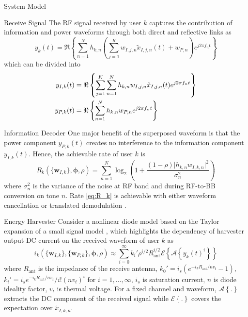 \documentclass{IEEEtran}
\begin{document}
\begin{section}{System Model}
	\begin{subsection}{Receive Signal}
		The RF signal received by user $k$ captures the contribution of information and power waveforms through both direct and reflective links as
		\begin{equation}\label{eq:y_k}
			y_k(t)=\Re\left\{\sum_{n=1}^N{h_{{k,n}}}\left(\sum_{j=1}^K{w_{I,j,n}\tilde{x}_{I,j,n}(t)}+w_{P,n}\right){e^{j2{\pi}{f_n}{t}}}\right\}
		\end{equation}
		which can be divided into
		\begin{align}\label{eq:y_{I/P,k}}
			y_{I,k}(t) & = \Re\left\{\sum_{j=1}^K\sum_{n=1}^N{h_{{k,n}}}{w_{I,j,n}\tilde{x}_{I,j,n}(t)}{e^{j2{\pi}{f_n}{t}}}\right\}\\
			y_{P,k}(t) & = \Re\left\{\sum_{n=1}^N{h_{{k,n}}}w_{P,n}{e^{j2{\pi}{f_n}{t}}}\right\}
		\end{align}
	\end{subsection}

	\begin{subsection}{Information Decoder}
		One major benefit of the superposed waveform is that the power component $y_{P,k}(t)$ creates no interference to the information component $y_{I,k}(t)$. Hence, the achievable rate of user $k$ is
		\begin{equation}\label{eq:R_k}
			R_k(\{\boldsymbol{w}_{I,k}\},\boldsymbol{\phi},\rho)=\sum_{n=1}^N{\log_2\left(1+\frac{(1-\rho)\lvert h_{k,n}w_{I,k,n} \rvert^2}{\sigma_n^2}\right)}
		\end{equation}
		where $\sigma_n^2$ is the variance of the noise at RF band and during RF-to-BB conversion on tone $n$. Rate \ref{eq:R_k} is achievable with either waveform cancellation or translated demodulation \cite{Clerckx2018b}.
	\end{subsection}

	\begin{subsection}{Energy Harvester}
		Consider a nonlinear diode model based on the Taylor expansion of a small signal model \cite{Clerckx2016a,Clerckx2018b}, which highlights the dependency of harvester output DC current on the received waveform of user $k$ as
		\begin{equation}\label{eq:i_k}
			i_k(\{\boldsymbol{w}_{I,k}\},\{\boldsymbol{w}_{P,k}\},\boldsymbol{\phi},\rho)\approx\sum_{i=0}^{\infty}{k_i'}{\rho^{i/2}}{R_{\text{ant}}^{i/2}}\mathcal{E}\left\{{\mathcal{A}\left\{y_k(t)^i\right\}}\right\}
		\end{equation}
		where $R_{\text{ant}}$ is the impedance of the receive antenna, $k_0'=i_s(e^{-i_kR_{\text{ant}}/nv_t}-1)$, $k_i'=i_se^{-i_kR_{\text{ant}}/nv_t}/i!(nv_t)^i$ for $i=1,\dots,\infty$, $i_s$ is saturation current, $n$ is diode ideality factor, $v_t$ is thermal voltage. For a fixed channel and waveform, $\mathcal{A}\left\{.\right\}$ extracts the DC component of the received signal while $\mathcal{E}\left\{.\right\}$ covers the expectation over $\tilde{x}_{I,k,n}$.


\end{subsection}
\end{section}
\end{document}
